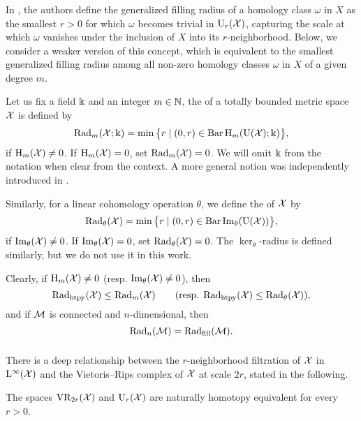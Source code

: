 \subsubsection{} \label{ss:beta v.s. fillrad}

In \cite[Defn.~9.44]{lim2024vietoris}, the authors define the generalized filling radius of a homology class \(\omega\) in \(X\) as the smallest \(r > 0\) for which \(\omega\) becomes trivial in \(\mathrm{U}_r(\mathcal{X})\), capturing the scale at which \(\omega\) vanishes under the inclusion of \(X\) into its \(r\)-neighborhood.
Below, we consider a weaker version of this concept, which is equivalent to the smallest generalized filling radius among all non-zero homology classes \(\omega\) in \(X\) of a given degree $m$.

Let us fix a field \(\Bbbk\) and an integer \(m \in \mathbb{N}\), the  of a totally bounded metric space \(\mathcal{X}\) is defined by
\[
\mathrm{Rad}_{m}(\mathcal{X}; \Bbbk) =
\min \big\{r \mid (0, r) \in \operatorname{Bar} \mathrm{H}_m(\mathrm{U}(\mathcal{X}); \Bbbk)\big\},
\]
if \(\mathrm{H}_m(\mathcal{X}) \neq 0\).
If \(\mathrm{H}_m(\mathcal{X}) = 0\), set \(\mathrm{Rad}_{m}(\mathcal{X}) = 0\).
We will omit \(\Bbbk\) from the notation when clear from the context.
A more general notion was independently introduced in \cite[Defn.~9.44]{lim2024vietoris}.

Similarly, for a linear cohomology operation \(\theta\), we define the  of \(\mathcal{X}\) by
\[
\mathrm{Rad}_{\theta}(\mathcal{X}) = \min \big\{r \mid (0, r) \in \operatorname{Bar} \operatorname{Im}_\theta(\mathrm{U}(\mathcal{X}))\big\},
\]
if \(\operatorname{Im}_\theta(\mathcal{X}) \neq 0\).
If \(\operatorname{Im}_\theta(\mathcal{X}) = 0\), set $\mathrm{Rad}_{\theta}(\mathcal{X}) = 0$.
The \(\ker_\theta\)-radius is defined similarly, but we do not use it in this work.

Clearly, if \(\mathrm{H}_m(\mathcal{X}) \neq 0\) (resp. \(\operatorname{Im}_\theta(\mathcal{X}) \neq 0\)), then
\[
\mathrm{Rad}_{\mathrm{htpy}}(\mathcal{X}) \leq \mathrm{Rad}_{m}(\mathcal{X}) \qquad (\text{resp. }\mathrm{Rad}_{\mathrm{htpy}}(\mathcal{X}) \leq  \mathrm{Rad}_{\theta}(\mathcal{X})),
\]
and if $\mathcal{M}$ is connected and $n$-dimensional, then
\[
\mathrm{Rad}_{n}(\mathcal{M}) = \mathrm{Rad}_{\mathrm{fill}}(\mathcal{M}).
\]


\subsubsection{}\label{ss:kuratowski_vr}

There is a deep relationship between the \(r\)-neighborhood filtration of $\mathcal{X}$ in $\mathrm{L}^\infty(\mathcal{X})$ and the Vietoris--Rips complex of \(\mathcal{X}\) at scale \(2r\), stated in the following.

\proposition \cite[Thm.~4.1]{lim2024vietoris} The spaces $\mathrm{VR}_{2r}(\mathcal{X})$ and $\mathrm{U}_r(\mathcal{X})$ are naturally homotopy equivalent for every \(r > 0\).


